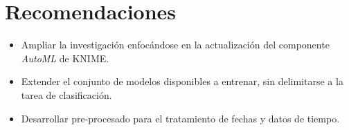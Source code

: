 \chapter*{Recomendaciones}
\begin{itemize}
	\item Ampliar la investigación enfocándose en la actualización del componente \textit{AutoML} de KNIME.
	\item Extender el conjunto de modelos disponibles a entrenar, sin delimitarse a la tarea de clasificación.
	\item Desarrollar pre-procesado para el tratamiento de fechas y datos de tiempo.
\end{itemize}
